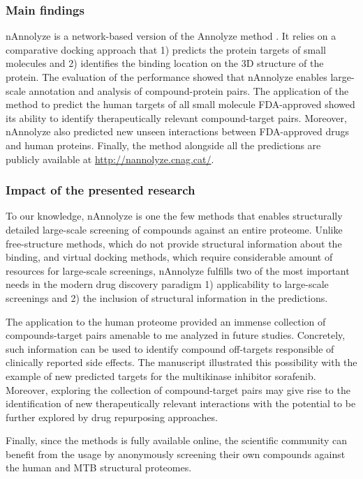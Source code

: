 \documentclass[11pt, b5paper,twoside]{tesi_upf}
\begin{document}
 \subsubsection{Main findings}
 \par nAnnolyze is a network-based version of the Annolyze method \cite{Marti-Renom2007}. It relies on a comparative docking approach that 1) predicts the protein targets of small molecules and 2) identifies the binding location on the 3D structure of the protein. The evaluation of the performance showed that nAnnolyze enables large-scale annotation and analysis of compound-protein pairs. The application of the method to predict the human targets of all small molecule FDA-approved showed its ability to identify therapeutically relevant compound-target pairs. Moreover, nAnnolyze also predicted new unseen interactions between FDA-approved drugs and human proteins. Finally, the method alongside all the predictions are publicly available at \url{http://nannolyze.cnag.cat/}.
 \subsubsection{Impact of the presented research} 
 \par To our knowledge, nAnnolyze is one the few methods that enables structurally detailed large-scale screening of compounds against an entire proteome. Unlike free-structure methods, which do not provide structural information about the binding, and virtual docking methods, which require considerable amount of resources for large-scale screenings, nAnnolyze fulfills two of the most important needs in the modern drug discovery paradigm 1) applicability to large-scale screenings and 2) the inclusion of structural information in the predictions. 
 \par The application to the human proteome provided an immense collection of compounds-target pairs amenable to me analyzed in future studies. Concretely, such information can be used to identify compound off-targets responsible of clinically reported side effects. The manuscript illustrated this possibility with the example of new predicted targets for the multikinase inhibitor sorafenib. Moreover, exploring the collection of compound-target pairs may give rise to the identification of new therapeutically relevant interactions with the potential to be further explored by drug repurposing approaches.  
 \par Finally, since the methods is fully available online, the scientific community can benefit from the usage by anonymously screening their own compounds against the human and MTB structural proteomes.
    
\end{document}
